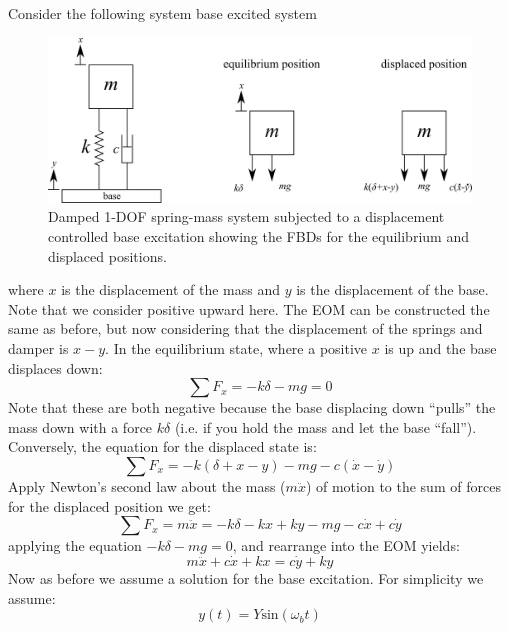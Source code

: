 \documentclass[12pt,letter]{article}
\numberwithin{ex}{section} %
\numberwithin{re}{section} %
\begin{document}
			Consider the following system base excited system
			\begin{figure}[H]
				\centering
				\includegraphics[]{../Figures/1_DOF_spring_dashpot_mass_vertical_base_excited_FBD.png}
				\caption{Damped 1-DOF spring-mass system subjected to a displacement controlled base excitation showing the FBDs for the equilibrium and displaced positions.}
				\label{fig:1_DOF_spring_dashpot_mass_vertical_base_excited_FBD}
			\end{figure}
			where $x$ is the displacement of the mass and $y$ is the displacement of the base. Note that we consider positive upward here. The EOM can be constructed the same as before, but now considering that the displacement of the springs and damper is $x-y$.  In the equilibrium state, where a positive $x$ is up and the base displaces down:
			\begin{equation}
			\sum F_x = -k\delta -mg =0
			\end{equation}	
			Note that these are both negative because the base displacing down ``pulls'' the mass down with a force $k\delta$ (i.e. if you hold the mass and let the base ``fall''). Conversely, the equation for the displaced state is:
			\begin{equation}
			\sum F_x = -k(\delta + x - y) -mg -c(\dot{x} -\dot{y})
			\end{equation}	
			Apply Newton's second law about the mass ($m\ddot{x}$) of motion to the sum of forces for the displaced position we get:
			\begin{equation}
			\sum F_x = m\ddot{x} = -k\delta -kx + ky -mg -c\dot{x} +c\dot{y}
			\end{equation}	
			applying the equation $-k\delta -mg =0$, and rearrange into the EOM yields:	
			\begin{equation}
			m\ddot{x} + c\dot{x} + kx = c\dot{y} + ky 
			\end{equation}
			Now as before we assume a solution for the base excitation. For simplicity we assume:
			\begin{equation}
			y(t) = Y\text{sin}(\omega_b t)
			\end{equation}
\end{document}
